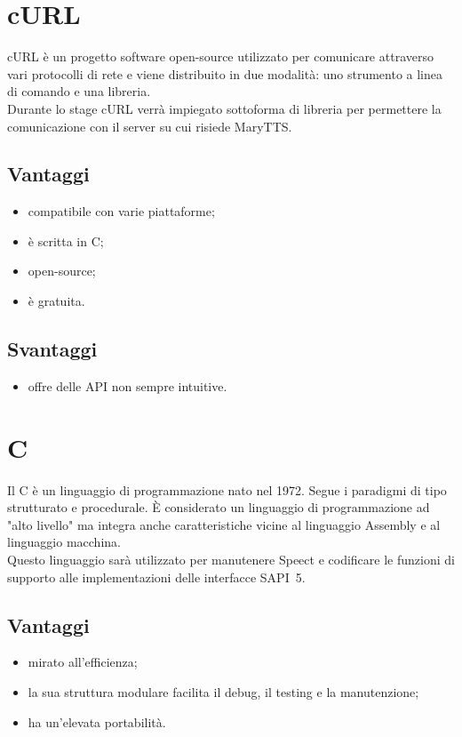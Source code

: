 \section{cURL}
cURL è un progetto software open-source utilizzato per comunicare attraverso vari protocolli di rete e viene distribuito in due modalità: uno strumento a linea di comando e una libreria.\\
Durante lo stage cURL verrà impiegato sottoforma di libreria per permettere la comunicazione con il server su cui risiede MaryTTS.
\subsection*{Vantaggi}
\begin{itemize}
	\item compatibile con varie piattaforme;
	\item è scritta in C;
	\item open-source;
	\item è gratuita.
\end{itemize}
\subsection*{Svantaggi}
\begin{itemize}
	\item offre delle API non sempre intuitive.
\end{itemize}
\section{C}
Il C è un linguaggio di programmazione nato nel 1972. Segue i paradigmi di tipo strutturato e procedurale. È considerato un linguaggio di programmazione ad "alto livello" ma integra anche caratteristiche vicine al linguaggio Assembly e al linguaggio macchina.\\
Questo linguaggio sarà utilizzato per manutenere Speect e codificare le funzioni di supporto alle implementazioni delle interfacce SAPI~5.
\subsection*{Vantaggi}
\begin{itemize}
	\item mirato all'efficienza;
	\item la sua struttura modulare facilita il debug, il testing e la manutenzione;
	\item ha un'elevata portabilità.
\end{itemize}
